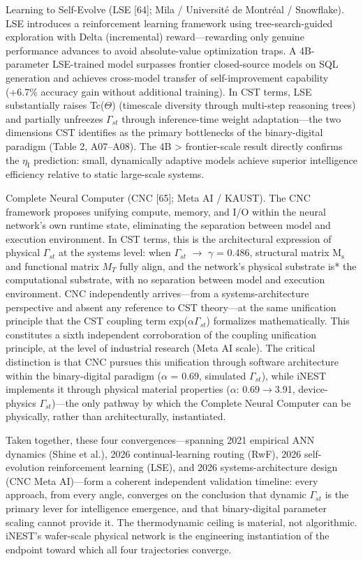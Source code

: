 \documentclass[a4paper,12pt]{article}
\providecommand{\textsubscript}[1]{\ensuremath{_{\text{#1}}}}
\begin{document}
Learning to Self-Evolve (LSE [64]; Mila / Universit\'e de Montr\'eal / Snowflake).
LSE introduces a reinforcement learning framework using tree-search-guided exploration with Delta (incremental) reward---rewarding only genuine performance advances to avoid absolute-value optimization traps.
A 4B-parameter LSE-trained model surpasses frontier closed-source models on SQL generation and achieves cross-model transfer of self-improvement capability (+6.7\% accuracy gain without additional training).
In CST terms, LSE substantially raises Tc($\Theta$) (timescale diversity through multi-step reasoning trees) and partially unfreezes $\Gamma_{st}$ through inference-time weight adaptation---the two dimensions CST identifies as the primary bottlenecks of the binary-digital paradigm (Table 2, A07--A08).
The 4B > frontier-scale result directly confirms the $\eta_{\text{I}}$ prediction: small, dynamically adaptive models achieve superior intelligence efficiency relative to static large-scale systems.


Complete Neural Computer (CNC [65]; Meta AI / KAUST).
The CNC framework proposes unifying compute, memory, and I/O within the neural network's own runtime state, eliminating the separation between model and execution environment.
In CST terms, this is the architectural expression of physical $\Gamma_{st}$ at the systems level: when $\Gamma_{st}$ $\rightarrow$ $\gamma$ = 0.486, structural matrix M\textsubscript{s} and functional matrix $M_{T}$ fully align, and the network's physical substrate is* the computational substrate, with no separation between model and execution environment.
CNC independently arrives---from a systems-architecture perspective and absent any reference to CST theory---at the same unification principle that the CST coupling term exp($\alpha$\cdot$\Gamma_{st}$) formalizes mathematically.
This constitutes a sixth independent corroboration of the coupling unification principle, at the level of industrial research (Meta AI scale).
The critical distinction is that CNC pursues this unification through software architecture within the binary-digital paradigm ($\alpha$ = 0.69, simulated $\Gamma_{st}$), while iNEST implements it through physical material properties ($\alpha$: 0.69$\rightarrow$3.91, device-physics $\Gamma_{st}$)---the only pathway by which the Complete Neural Computer can be physically, rather than architecturally, instantiated.


Taken together, these four convergences---spanning 2021 empirical ANN dynamics (Shine et al.), 2026 continual-learning routing (RwF), 2026 self-evolution reinforcement learning (LSE), and 2026 systems-architecture design (CNC Meta AI)---form a coherent independent validation timeline: every approach, from every angle, converges on the conclusion that dynamic $\Gamma_{st}$ is the primary lever for intelligence emergence, and that binary-digital parameter scaling cannot provide it.
The thermodynamic ceiling is material, not algorithmic. iNEST's wafer-scale physical network is the engineering instantiation of the endpoint toward which all four trajectories converge.
\end{document}
